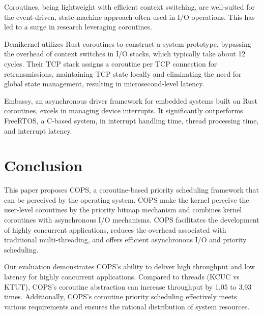 \documentclass[conference]{IEEEtran}
\begin{document}
Coroutines, being lightweight with efficient context switching, are well-suited for the event-driven, state-machine approach often used in I/O operations. This has led to a surge in research leveraging coroutines.

Demikernel\cite{zhang_demikernel_2021} utilizes Rust coroutines to construct a system prototype, bypassing the overhead of context switches in I/O stacks, which typically take about 12 cycles. Their TCP stack assigns a coroutine per TCP connection for retransmissions, maintaining TCP state locally and eliminating the need for global state management, resulting in microsecond-level latency.

Embassy\cite{embassy}, an asynchronous driver framework for embedded systems built on Rust coroutines, excels in managing device interrupts. It significantly outperforms FreeRTOS, a C-based system, in interrupt handling time, thread processing time, and interrupt latency.

\section{Conclusion}
\label{section: Conclusion}

This paper proposes COPS, a coroutine-based priority scheduling framework that can be perceived by the operating system. COPS make the kernel perceive the user-level coroutines by the priority bitmap mechanism and combines kernel coroutines with asynchronous I/O mechanisms. COPS facilitates the development of highly concurrent applications, reduces the overhead associated with traditional multi-threading, and offers efficient asynchronous I/O and priority scheduling.

Our evaluation demonstrates COPS's ability to deliver high throughput and low latency for highly concurrent applications. Compared to threads (KCUC vs KTUT), COPS's coroutine abstraction can increase throughput by 1.05 to 3.93 times. Additionally, COPS's coroutine priority scheduling effectively meets various requirements and ensures the rational distribution of system resources.



\end{document}
